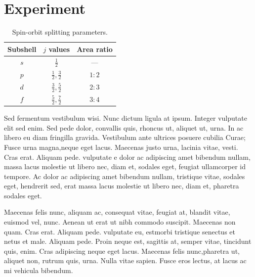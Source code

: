 \documentclass[a4paper,10pt,twocolumn]{scrartcl} %
\begin{document}
\section{Experiment}


\begin{table}[htbp]          %
\centering
\begin{tabular*}{\linewidth}{@{\extracolsep{\fill}}ccc}
\hline
\hline
\rule[-7pt]{0pt}{23pt}  Subshell  &     $j$ values 						  		&     Area ratio \\
\hline
\rule[-6pt]{0pt}{21pt}   $s$ 			&     $\frac{1}{2}$ 							&       --- \\

\rule[-6pt]{0pt}{21pt}   $p$ 			&     $\frac{1}{2},\frac{3}{2}$ 	&     $1:2$ \\

\rule[-6pt]{0pt}{21pt}   $d$ 			&     $\frac{3}{2},\frac{5}{2}$ 	&     $2:3$ \\

\rule[-7pt]{0pt}{22pt}   $f$ 			&     $\frac{5}{2},\frac{7}{2}$ 	&     $3:4$ \\
\hline
\hline
\end{tabular*}  
\caption[]{Spin-orbit splitting parameters.}  %
\label{spinsplit}                             %
\end{table}
Sed fermentum vestibulum wisi. Nunc dictum ligula at ipsum. Integer vulputate elit sed enim. Sed pede dolor, convallis quis, rhoncus ut, aliquet ut, urna. In ac libero eu diam fringilla gravida. Vestibulum ante ultrices posuere cubilia Curae; Fusce urna magna,neque eget lacus. Maecenas justo urna, lacinia vitae, vesti. Cras erat. Aliquam pede. vulputate e dolor ac adipiscing amet bibendum nullam, massa lacus molestie ut libero nec, diam et, sodales eget, feugiat ullamcorper id tempore. Ac dolor ac adipiscing amet bibendum nullam, tristique vitae, sodales eget, hendrerit sed, erat massa lacus molestie ut libero nec, diam et, pharetra sodales eget.

Maecenas felis nunc, aliquam ac, consequat vitae, feugiat at, blandit vitae, euismod vel, nunc. Aenean ut erat ut nibh commodo suscipit. Maecenas non quam. Cras erat. Aliquam pede. vulputate eu, estmorbi tristique senectus et netus et male. Aliquam pede. Proin neque est, sagittis at, semper vitae, tincidunt quis, enim. Cras adipiscing neque eget lacus. Maecenas felis nunc,pharetra ut, aliquet non, rutrum quis, urna. Nulla vitae sapien. Fusce eros lectus, at lacus ac mi vehicula bibendum.
\end{document}
